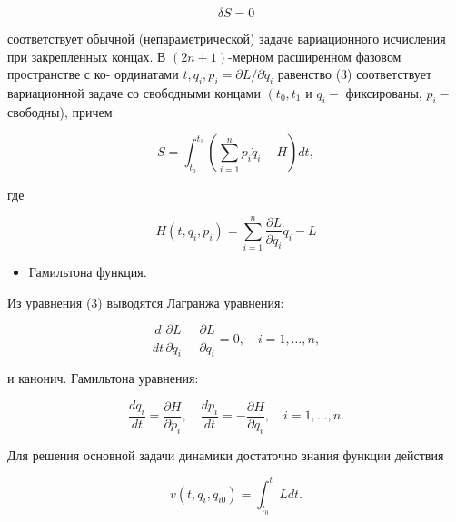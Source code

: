 \documentclass[10pt]{article}
\begin{document}
\[

\delta S=0

\]



соответствует обычной (непараметрической) задаче вариационного исчисления при закрепленных концах. В $(2 n+1)$-мерном расширенном фазовом пространстве с ко- ординатами $t, q_{i}, p_{i}=\partial L / \partial \dot{q}_{i}$ равенство (3) соответствует вариационной задаче со свободными концами $\left(t_{0}, t_{1}\right.$ и $q_{i}-$ фиксированы, $p_{i}-$ свободны), причем



\[

S=\int_{t_{0}}^{t_{1}}\left(\sum_{i=1}^{n} p_{i} \dot{q}_{i}-H\right) d t,

\]



где



\[

H\left(t, q_{i}, p_{i}\right)=\sum_{i=1}^{n} \frac{\partial L}{\partial \dot{q}_{i}} \dot{q}_{i}-L

\]



\begin{itemize}

  \item Гамильтона функция.

\end{itemize}



Из уравнения (3) выводятся Лагранжа уравнения:



\[

\frac{d}{d t} \frac{\partial L}{\partial \dot{q}_{i}}-\frac{\partial L}{\partial q_{i}}=0, \quad i=1, \ldots, n,

\]



и канонич. Гамильтона уравнения:



\[

\frac{d q_{i}}{d t}=\frac{\partial H}{\partial p_{i}}, \quad \frac{d p_{i}}{d t}=-\frac{\partial H}{\partial q_{i}}, \quad i=1, \ldots, n .

\]



Для решения основной задачи динамики достаточно знания функции действия



\[

v\left(t, q_{i}, q_{i 0}\right)=\int_{t_{0}}^{t} L d t .

\]
\end{document}
